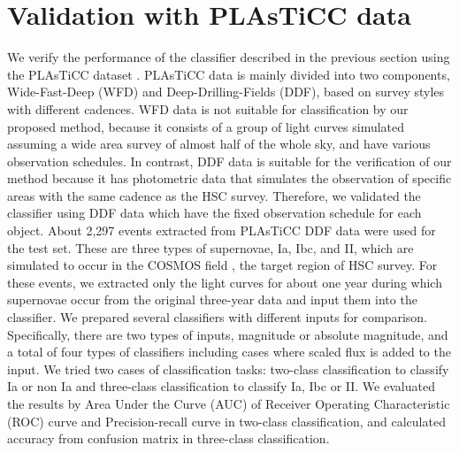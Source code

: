 \documentclass[useamsfonts]{pasj01}
\begin{document}
\section{Validation with PLAsTiCC data} %
%
We verify the performance of the classifier described in the previous section using the PLAsTiCC dataset \citep{plasticc_dataset}.
PLAsTiCC data is mainly divided into two components, Wide-Fast-Deep (WFD) and Deep-Drilling-Fields (DDF), based on survey styles with different cadences.
WFD data is not suitable for classification by our proposed method, because it consists of a group of light curves simulated assuming a wide area survey of almost half of the whole sky, and have various observation schedules.
In contrast, DDF data is suitable for the verification of our method because it has photometric data that simulates the observation of specific areas with the same cadence as the HSC survey.
Therefore, we validated the classifier using DDF data which have the fixed observation schedule for each object.
About 2,297 events extracted from PLAsTiCC DDF data were used for the test set.
These are three types of supernovae, Ia, Ibc, and II, which are simulated to occur in the COSMOS field \citep{scoville2007cosmos}, the target region of HSC survey.
For these events, we extracted only the light curves for about one year during which supernovae occur from the original three-year data and input them into the classifier.
%
We prepared several classifiers with different inputs for comparison.
Specifically, there are two types of inputs, magnitude or absolute magnitude, and a total of four types of classifiers including cases where scaled flux is added to the input. 
We tried two cases of classification tasks: two-class classification to classify Ia or non Ia and three-class classification to classify Ia, Ibc or II.
We evaluated the results by Area Under the Curve (AUC) of Receiver Operating Characteristic (ROC) curve and Precision-recall curve in two-class classification, and calculated accuracy from confusion matrix in three-class classification.
%
\end{document}
